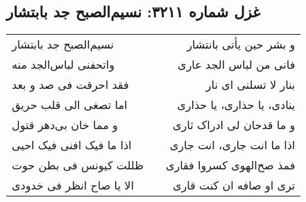 \begin{center}
\section*{غزل شماره ۳۲۱۱: نسیم‌الصبح جد بابتشار}
\label{sec:3211}
\begin{longtable}{l p{0.5cm} r}
نسیم‌الصبح جد بابتشار
&&
و بشر حین یأتی بانتشار
\\
واتحفنی لباس‌الجد منه
&&
فانی من لباس الجد عاری
\\
فقد احرقت فی صد و بعد
&&
بنار لا تسلنی ای نار
\\
اما تصغی الی قلب حریق
&&
ینادی، یا حذاری، یا حذاری
\\
و مما خان بی‌دهر قتول
&&
و ما قدحان لی ادراک ثاری
\\
اذا ما فیک افنی فیک احیی
&&
اذا ما انت جاری، انت جاری
\\
ظللت کیونس فی بطن حوت
&&
فمذ صح‌الهوی کسروا فقاری
\\
الا یا صاح انظر فی خدودی
&&
تری او صافه ان کنت قاری
\\
\end{longtable}
\end{center}
